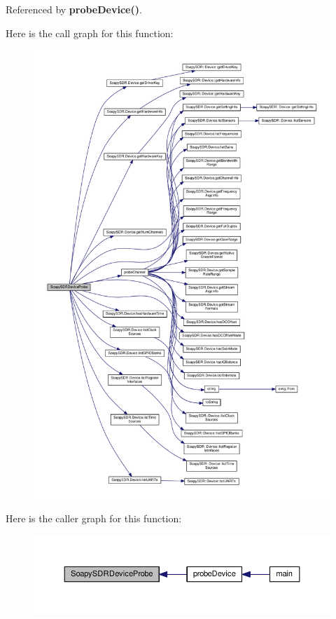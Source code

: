 Referenced by {\bf probe\+Device()}.



Here is the call graph for this function\+:
\nopagebreak
\begin{figure}[H]
\begin{center}
\leavevmode
\includegraphics[width=350pt]{d3/dca/SoapySDRUtil_8cpp_ae30f402e0fedf54f66f977540eb693ea_cgraph}
\end{center}
\end{figure}




Here is the caller graph for this function\+:
\nopagebreak
\begin{figure}[H]
\begin{center}
\leavevmode
\includegraphics[width=350pt]{d3/dca/SoapySDRUtil_8cpp_ae30f402e0fedf54f66f977540eb693ea_icgraph}
\end{center}
\end{figure}


